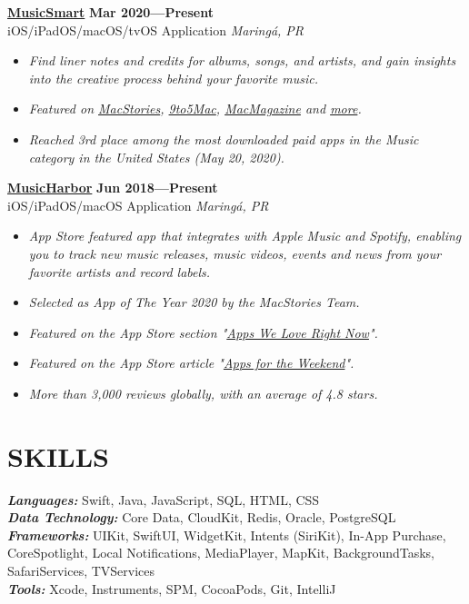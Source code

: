 \documentclass[line,margin]{res}
\begin{document}
\begin{resume}
  {\bf \href{https://apps.apple.com/us/app/musicsmart/id1512195368}{MusicSmart}} \hfill {\bf Mar 2020---Present} \\
  iOS/iPadOS/macOS/tvOS Application \hfill {\sl Maring\'a, PR}\\[-6pt]
    \begin{itemize}
    \item {\sl Find liner notes and credits for albums,  songs,  and artists,  and gain insights into the creative process behind your favorite music.}
    \item {\sl Featured on \href{https://www.macstories.net/reviews/musicsmart-puts-the-spotlight-on-music-credits/}{MacStories}, \href{https://9to5mac.com/2020/05/19/musicsmart-apple-music-app/}{9to5Mac}, \href{https://macmagazine.uol.com.br/post/2020/05/21/aplicativo-brasileiro-musicsmart-traz-detalhes-aprofundados-sobre-as-cancoes-do-apple-music/}{MacMagazine} and \href{https://twitter.com/chockenberry/status/1262803700658999296}{more}.}
    \item {\sl Reached 3rd place among the most downloaded paid apps in the Music category in the United States (May 20, 2020).}
    \end{itemize}
  
  {\bf \href{https://apps.apple.com/us/app/musicharbor/id1440405750}{MusicHarbor}} \hfill {\bf Jun 2018---Present} \\
  iOS/iPadOS/macOS Application \hfill {\sl Maring\'a, PR}\\[-6pt]
    \begin{itemize}
    \item {\sl App Store featured app that integrates with Apple Music and Spotify, enabling you to track new music releases, music videos, events and news from your favorite artists and record labels.}
    \item {\sl Selected as App of The Year 2020 by the MacStories Team.}
    \item {\sl Featured on the App Store section "\href{https://github.com/marcosatanaka/resume-latex/blob/master/images/apps_we_love_right_now.png?raw=true}{Apps We Love Right Now}".}
    \item {\sl Featured on the App Store article "\href{https://apps.apple.com/us/story/id1516537723}{Apps for the Weekend}".}
    \item {\sl More than 3,000 reviews globally,  with an average of 4.8 stars.}
    \end{itemize}


\section{SKILLS}
  {\sl {\bf Languages:}} Swift, Java, JavaScript, SQL, HTML, CSS \\
  {\sl {\bf Data Technology:}} Core Data, CloudKit, Redis, Oracle, PostgreSQL \\
  {\sl {\bf Frameworks:}} UIKit, SwiftUI, WidgetKit, Intents (SiriKit), In-App Purchase, CoreSpotlight, Local Notifications, MediaPlayer, MapKit, BackgroundTasks, SafariServices, TVServices \\
  {\sl {\bf Tools:}} Xcode, Instruments, SPM, CocoaPods, Git, IntelliJ



\end{resume}
\end{document}
